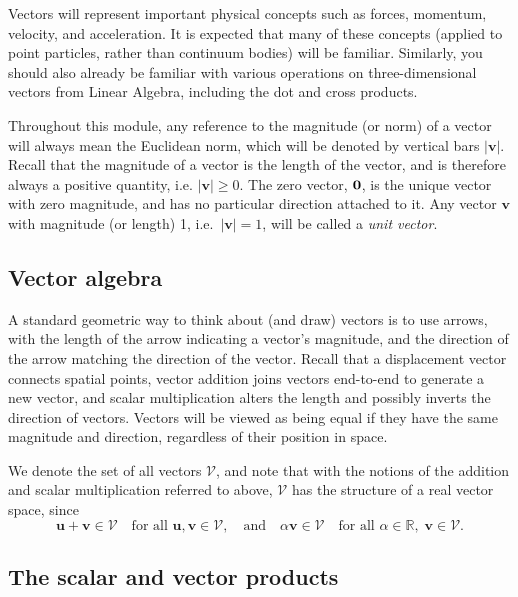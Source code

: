 \documentclass[
  letterpaper,
  DIV=11,
  numbers=noendperiod]{scrreprt}
\theoremstyle{plain}
\theoremstyle{remark}
\begin{document}
Vectors will represent important physical concepts such as forces,
momentum, velocity, and acceleration. It is expected that many of these
concepts (applied to point particles, rather than continuum bodies) will
be familiar. Similarly, you should also already be familiar with various
operations on three-dimensional vectors from Linear Algebra, including
the dot and cross products.

Throughout this module, any reference to the magnitude (or norm) of a
vector will always mean the Euclidean norm, which will be denoted by
vertical bars \(|{\boldsymbol{v}}|\). Recall that the magnitude of a
vector is the length of the vector, and is therefore always a positive
quantity, i.e. \(|{\boldsymbol{v}}|\geq0\). The zero vector, \(\bf0\),
is the unique vector with zero magnitude, and has no particular
direction attached to it. Any vector \({\boldsymbol{v}}\) with magnitude
(or length) 1, i.e.~\(|{\boldsymbol{v}}|=1\), will be called a
\emph{unit vector}.

\subsection{Vector algebra}\label{vector-algebra}

A standard geometric way to think about (and draw) vectors is to use
arrows, with the length of the arrow indicating a vector's magnitude,
and the direction of the arrow matching the direction of the vector.
Recall that a displacement vector connects spatial points, vector
addition joins vectors end-to-end to generate a new vector, and scalar
multiplication alters the length and possibly inverts the direction of
vectors. Vectors will be viewed as being equal if they have the same
magnitude and direction, regardless of their position in space.

We denote the set of all vectors \({\mathcal{V}}\), and note that with
the notions of the addition and scalar multiplication referred to above,
\({\mathcal{V}}\) has the structure of a real vector space, since
\[{\boldsymbol{u}}+ {\boldsymbol{v}}\in{\mathcal{V}}\quad\text{for all }{\boldsymbol{u}},{\boldsymbol{v}}\in{\mathcal{V}},\quad\text{and}\quad \alpha {\boldsymbol{v}}\in{\mathcal{V}}\quad\text{for all }\alpha\in{\mathbb{R}},\;{\boldsymbol{v}}\in{\mathcal{V}}.\]

\subsection{The scalar and vector
products}\label{the-scalar-and-vector-products}
\end{document}
